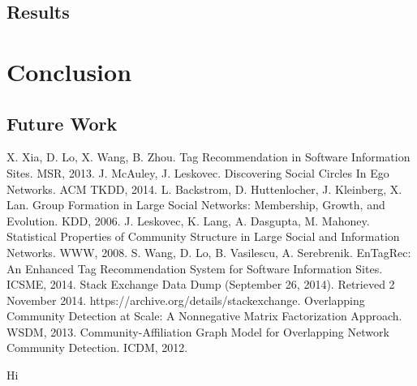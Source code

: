 \documentclass[11pt]{IEEEtran}
\begin{document}
\subsection{Results}

\section{Conclusion}

\subsection{Future Work}

\begin{thebibliography}{1}
 X. Xia, D. Lo, X. Wang, B. Zhou. Tag Recommendation in Software Information Sites. MSR, 2013.
 J. McAuley, J. Leskovec. Discovering Social Circles In Ego Networks. ACM TKDD, 2014.
 L. Backstrom, D. Huttenlocher, J. Kleinberg, X. Lan. Group Formation in Large Social Networks: Membership, Growth, and Evolution. KDD, 2006.
 J. Leskovec, K. Lang, A. Dasgupta, M. Mahoney. Statistical Properties of Community Structure in Large Social and Information Networks. WWW, 2008.
 S. Wang, D. Lo, B. Vasilescu, A. Serebrenik. EnTagRec: An Enhanced Tag Recommendation System for Software Information Sites. ICSME, 2014.
 Stack Exchange Data Dump (September 26, 2014). Retrieved 2 November 2014. https://archive.org/details/stackexchange.
 Overlapping Community Detection at Scale: A Nonnegative Matrix Factorization Approach. WSDM, 2013.
 Community-Affiliation Graph Model for Overlapping Network Community Detection. ICDM, 2012.
\end{thebibliography}

\appendix

Hi

\end{document}

